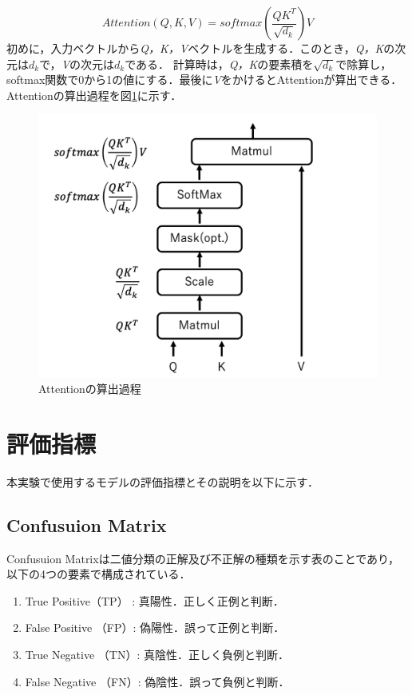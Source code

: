 \documentclass[a4paper, oneside, openany, dvipdfmx]{suribt}%
\newcommand{\fref}[1]{図\ref{#1}}
\begin{document}
\begin{equation}
  Attention(Q,K,V) = softmax(\frac{QK^{T}}{\sqrt{d_{k}}})V
  \label{eq:network-input5}
\end{equation}
初めに，入力ベクトルから\textit{Q，K，V}ベクトルを生成する．このとき，\textit{Q，K}の次元は$d_{k}$で，\textit{V}の次元は$d_{k}$である．
計算時は，\textit{Q，K}の要素積を$\sqrt{d_{k}}$で除算し，softmax関数で0から1の値にする．最後に\textit{V}をかけるとAttentionが算出できる．
Attentionの算出過程を\fref{fig:attention}に示す．
\begin{figure}[h]
  \centering
  \includegraphics[width=0.9\linewidth]{figs/attention.png}
  \caption{Attentionの算出過程}
  \label{fig:attention}
\end{figure}

\section{評価指標}
本実験で使用するモデルの評価指標とその説明を以下に示す．
\subsection{Confusuion Matrix}
Confusuion Matrixは二値分類の正解及び不正解の種類を示す表のことであり，以下の4つの要素で構成されている．
\begin{enumerate}
  \item True Positive（TP） : 真陽性．正しく正例と判断．
  \item False Positive （FP）: 偽陽性．誤って正例と判断．
  \item True Negative （TN）: 真陰性．正しく負例と判断．
  \item False Negative （FN）: 偽陰性．誤って負例と判断．
\end{enumerate}
\end{document}
